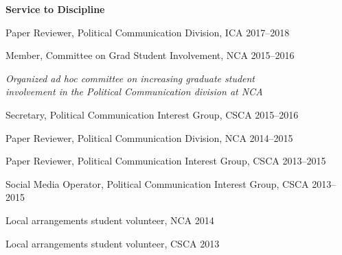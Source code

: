 \textbf{Service to Discipline}
  \begin{innerlist}
    \item Paper Reviewer, Political Communication Division, ICA \hfill 2017--2018
    \item Member, Committee on Grad Student Involvement, NCA \hfill 2015--2016
    \begin{outerlist}
      \item[]\textit{Organized ad hoc committee on increasing graduate student \\
        involvement in the Political Communication division at NCA}\bigskip
      \end{outerlist}
    \item Secretary, Political Communication Interest Group, CSCA \hfill 2015--2016
    \item Paper Reviewer, Political Communication Division, NCA \hfill 2014--2015
    \item Paper Reviewer, Political Communication Interest Group, CSCA \hfill 2013--2015
    \item Social Media Operator, Political Communication Interest Group, CSCA \hfill 2013--2015
    \item Local arrangements student volunteer, NCA \hfill 2014
    \item Local arrangements student volunteer, CSCA \hfill 2013
  \end{innerlist}

